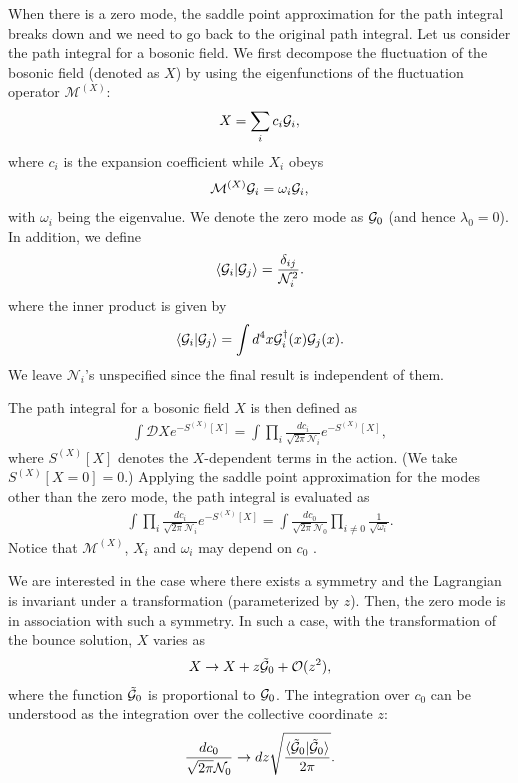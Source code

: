 \documentclass[12pt]{article}
\begin{document}
When there is a zero mode, the saddle point approximation for the path
integral breaks down and we need to go back to the original path
integral.  Let us consider the path integral for a bosonic field.  We
first decompose the fluctuation of the bosonic field (denoted as $X$)
by using the eigenfunctions of the fluctuation operator $\mathcal
M^{(X)}$:
\begin{align}
  X = \sum_ic_i {\cal G}_i,
\end{align}
where $c_i$ is the expansion coefficient while $X_i$ obeys
\begin{align}
  \mathcal M^{(X)} {\cal G}_i = \omega_i {\cal G}_i,
\end{align}
with $\omega_i$ being the eigenvalue.  We denote the zero mode as
${\cal G}_0$ (and hence $\lambda_0=0$).  In addition, we define 
\begin{align}
  \langle {\cal G}_i| {\cal G}_j \rangle = \frac{\delta_{ij}}{\mathcal N_i^2}.
  \label{eq_normalization}
\end{align}
where the inner product is given by
\begin{align}
 \langle {\cal G}_i| {\cal G}_j\rangle = \int d^4x {\cal G}_i^\dagger(x) {\cal G}_j(x).
\end{align}
We leave $\mathcal N_i$'s unspecified since the final result is
independent of them.  

The path integral for a bosonic field $X$ is then defined as
\begin{align}
 \int \mathcal DXe^{-S^{(X)}[X]}
 = \int \prod_i\frac{dc_i}{\sqrt{2\pi}\mathcal N_i}e^{-S^{(X)}[X]},
\end{align}
where $S^{(X)}[X]$ denotes the $X$-dependent terms in the action.  (We
take $S^{(X)}[X=0]=0$.)  Applying the saddle point approximation for
the modes other than the zero mode, the path integral is evaluated as
\begin{align}
  \int \prod_i\frac{dc_i}{\sqrt{2\pi}\mathcal N_i}e^{-S^{(X)}[X]}
  = \int \frac{dc_0}{\sqrt{2\pi}\mathcal N_0}
  \prod_{i\neq0}\frac{1}{\sqrt{\omega_i}}.
\end{align}
Notice that $\mathcal M^{(X)}$, $X_i$ and $\omega_i$ may depend on
$c_0$ \cite{Weinberg???}.

We are interested in the case where there exists a symmetry and the
Lagrangian is invariant under a transformation (parameterized by $z$).
Then, the zero mode is in association with such a symmetry.  In such a
case, with the transformation of the bounce solution, $X$ varies as
\begin{align}
 X \to X + z \tilde{{\cal G}}_0+\mathcal O(z^2),
\end{align}
where the function $\tilde{{\cal G}}_0$ is proportional to ${\cal G}_0$.  The
integration over $c_0$ can be understood as the integration over the
collective coordinate $z$:
\begin{align}
  \frac{dc_0}{\sqrt{2\pi}\mathcal N_0}
  \rightarrow
  dz\sqrt{\frac{\langle\tilde{{\cal G}}_0|\tilde{{\cal G}}_0\rangle}{2\pi}}.
  \label{eq_dzIntegral}
\end{align}
\end{document}
